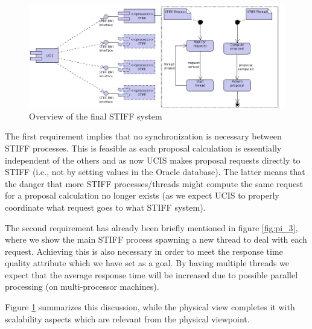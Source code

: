 \begin{figure}[ht]
\begin{center}
\includegraphics[width=\linewidth]{img/stiff.png}
\end{center}
\caption{Overview of the final STIFF system}
\label{fig:stiff}
\end{figure}

The first requirement implies that no synchronization is necessary between STIFF processes. This
is feasible as each proposal calculation is essentially independent of the others and as now UCIS
makes proposal requests directly to STIFF (i.e., not by setting values in the Oracle database). The
latter means that the danger that more STIFF processes/threads might compute the same request
for a proposal calculation no longer exists (as we expect UCIS to properly coordinate what request
goes to what STIFF system).

The second requirement has already been briefly mentioned in figure \ref{fig:pi_3}, where we show
the main STIFF process spawning a new thread to deal with each request. Achieving this is also
necessary in order to meet the response time quality attribute which we have set as a goal. By having
multiple threads we expect that the average response time will be increased due to possible parallel
processing (on multi-processor machines).

Figure \ref{fig:stiff} summarizes this discussion, while the physical view completes it with scalability
aspects which are relevant from the physical viewpoint.